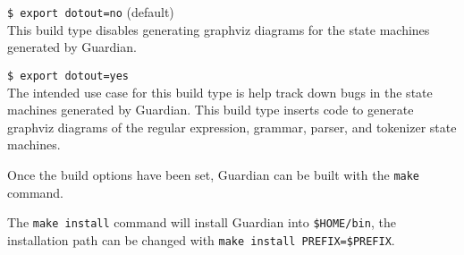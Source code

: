 {\begin{itemize}
{		\item {\texttt{\$ export dotout=no} (default)}\\
		{
			This build type disables generating graphviz diagrams for the
			state machines generated by Guardian.
		}
		
		\item {\texttt{\$ export dotout=yes}}\\
		{
			The intended use case for this build type is help track down bugs
			in the state machines generated by Guardian. This build type
			inserts code to generate graphviz diagrams of the regular expression,
			grammar, parser, and tokenizer state machines.
		}
	}
	\end{itemize}
	
	Once the build options have been set, Guardian can be built with the
	\texttt{make} command.
	
	The \texttt{make install} command will install Guardian into
	\texttt{\${HOME}/bin}, the installation path can be changed with
	\texttt{make install PREFIX=\${PREFIX}}.
}
















